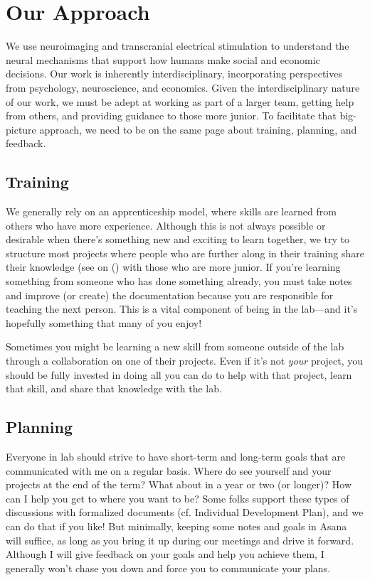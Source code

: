 \documentclass[letterpaper,11pt,oneside]{memoir}
\begin{document}
\section{Our Approach}
We use neuroimaging and transcranial electrical stimulation to understand the neural mechanisms that support how humans make social and economic decisions. Our work is inherently interdisciplinary, incorporating perspectives from psychology, neuroscience, and economics. Given the interdisciplinary nature of our work, we must be adept at working as part of a larger team, getting help from others, and providing guidance to those more junior. To facilitate that big-picture approach, we need to be on the same page about training, planning, and feedback. 

\subsection{Training}
\label{sec:training}
We generally rely on an apprenticeship model, where skills are learned from others who have more experience. Although this is not always possible or desirable when there's something new and exciting to learn together, we try to structure most projects where people who are further along in their training share their knowledge (see  on () with those who are more junior. If you're learning something from someone who has done something already, you must take notes and improve (or create) the documentation because you are responsible for teaching the next person. This is a vital component of being in the lab---and it's hopefully something that many of you enjoy!

Sometimes you might be learning a new skill from someone outside of the lab through a collaboration on one of their projects. Even if it's not \textit{your} project, you should be fully invested in doing all you can do to help with that project, learn that skill, and share that knowledge with the lab. 

\subsection{Planning}
Everyone in lab should strive to have short-term and long-term goals that are communicated with me on a regular basis. Where do see yourself and your projects at the end of the term? What about in a year or two (or longer)? How can I help you get to where you want to be? Some folks support these types of discussions with formalized documents (cf. Individual Development Plan), and we can do that if you like! But minimally, keeping some notes and goals in Asana will suffice, as long as you bring it up during our meetings and drive it forward. Although I will give feedback on your goals and help you achieve them, I generally won't chase you down and force you to communicate your plans.    
\end{document}
